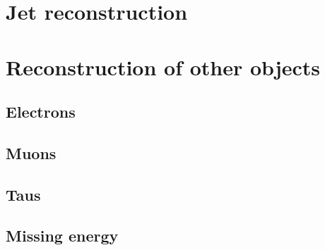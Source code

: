 \section{Jet reconstruction}

\section{Reconstruction of other objects}
\subsection{Electrons}
\subsection{Muons}
\subsection{Taus}
\subsection{Missing energy}
